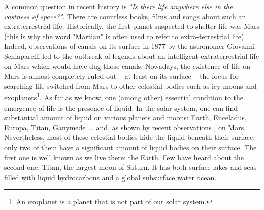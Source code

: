 A common question in recent history is \textit{"Is there life anywhere else in the vastness of space?"}. There are countless books, films and songs about such an extraterrestrial life. Historically, the first planet suspected to shelter life was Mars (this is why the word "Martian" is often used to refer to extra-terrestrial life). Indeed, observations of canals on its surface in 1877 by the astronomer Giovanni Schiaparelli led to the outbreak of legends about an intelligent extraterrestrial life on Mars which would have dug those canals. Nowadays, the existence of life on Mars is almost completely ruled out -- at least on its surface -- the focus for searching life switched from Mars to other celestial bodies such as icy moons and exoplanets\footnote{An exoplanet is a planet that is not part of our solar system.}. As far as we know, one (among other) essential condition to the emergence of life is the presence of liquid. In the solar system, one can find substantial amount of liquid on various planets and moons: Earth, Enceladus, Europa, Titan, Ganymede ... and, as shown by recent observations \citep{orosei2018radar}, on Mars. Nevertheless, most of these celestial bodies hide the liquid beneath their surface: only two of them have a significant amount of liquid bodies on their surface. The first one is well known as we live there: the Earth. Few have heard about the second one: Titan, the largest moon of Saturn. It has both surface lakes and seas filled with liquid hydrocarbons and a global subsurface water ocean. 
 
